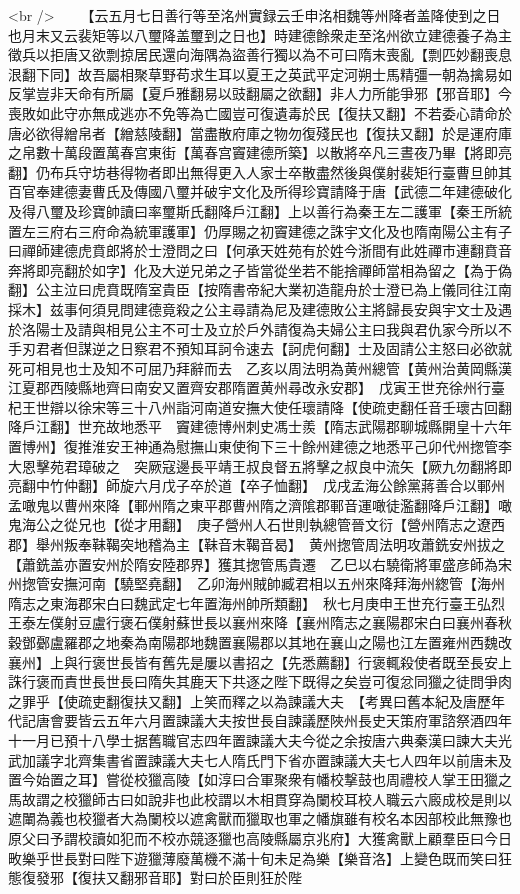 <br />
　　【云五月七日善行等至洺州實録云壬申洺相魏等州降者盖降使到之日也月末又云裴矩等以八璽降盖璽到之日也】時建德餘衆走至洺州欲立建德養子為主徵兵以拒唐又欲剽掠居民還向海隅為盜善行獨以為不可曰隋末喪亂【剽匹妙翻喪息泿翻下同】故吾屬相聚草野苟求生耳以夏王之英武平定河朔士馬精彊一朝為擒易如反掌豈非天命有所屬【夏戶雅翻易以豉翻屬之欲翻】非人力所能爭邪【邪音耶】今喪敗如此守亦無成逃亦不免等為亡國豈可復遺毒於民【復扶又翻】不若委心請命於唐必欲得繒帛者【繒慈陵翻】當盡散府庫之物勿復殘民也【復扶又翻】於是運府庫之帛數十萬段置萬春宫東街【萬春宫竇建德所築】以散將卒凡三晝夜乃畢【將即亮翻】仍布兵守坊巷得物者即出無得更入人家士卒散盡然後與僕射裴矩行臺曹旦帥其百官奉建德妻曹氏及傳國八璽并破宇文化及所得珍寶請降于唐【武德二年建德破化及得八璽及珍寶帥讀曰率璽斯氏翻降戶江翻】上以善行為秦王左二護軍【秦王所統置左三府右三府命為統軍護軍】仍厚賜之初竇建德之誅宇文化及也隋南陽公主有子曰禪師建德虎賁郎將於士澄問之曰【何承天姓苑有於姓今浙間有此姓禪市連翻賁音奔將即亮翻於如字】化及大逆兄弟之子皆當從坐若不能捨禪師當相為留之【為于偽翻】公主泣曰虎賁既隋室貴臣【按隋書帝紀大業初造龍舟於士澄已為上儀同往江南採木】兹事何須見問建德竟殺之公主尋請為尼及建德敗公主將歸長安與宇文士及遇於洛陽士及請與相見公主不可士及立於戶外請復為夫婦公主曰我與君仇家今所以不手刃君者但謀逆之日察君不預知耳訶令速去【訶虎何翻】士及固請公主怒曰必欲就死可相見也士及知不可屈乃拜辭而去　乙亥以周法明為黄州總管【黄州治黄岡縣漢江夏郡西陵縣地齊曰南安又置齊安郡隋置黄州尋改永安郡】　戊寅王世充徐州行臺杞王世辯以徐宋等三十八州詣河南道安撫大使任瓌請降【使疏吏翻任音壬瓌古回翻降戶江翻】世充故地悉平　竇建德博州刺史馮士羨【隋志武陽郡聊城縣開皇十六年置博州】復推淮安王神通為慰撫山東使徇下三十餘州建德之地悉平己卯代州揔管李大恩擊苑君璋破之　突厥寇邊長平靖王叔良督五將擊之叔良中流矢【厥九勿翻將即亮翻中竹仲翻】師旋六月戊子卒於道【卒子恤翻】　戊戌孟海公餘黨蔣善合以鄆州孟噉鬼以曹州來降【鄆州隋之東平郡曹州隋之濟隂郡鄆音運噉徒濫翻降戶江翻】噉鬼海公之從兄也【從才用翻】　庚子營州人石世則執總管晉文衍【營州隋志之遼西郡】舉州叛奉靺鞨突地稽為主【靺音末鞨音曷】　黄州揔管周法明攻蕭銑安州拔之【蕭銑盖亦置安州於隋安陸郡界】獲其揔管馬貴遷　乙巳以右驍衛將軍盛彦師為宋州揔管安撫河南【驍堅堯翻】　乙卯海州賊帥臧君相以五州來降拜海州緫管【海州隋志之東海郡宋白曰魏武定七年置海州帥所類翻】　秋七月庚申王世充行臺王弘烈王泰左僕射豆盧行褒石僕射蘇世長以襄州來降【襄州隋志之襄陽郡宋白曰襄州春秋穀鄧鄾盧羅郡之地秦為南陽郡地魏置襄陽郡以其地在襄山之陽也江左置雍州西魏改襄州】上與行褒世長皆有舊先是屢以書招之【先悉薦翻】行褒輒殺使者既至長安上誅行褒而責世長世長曰隋失其鹿天下共逐之陛下既得之矣豈可復忿同獵之徒問爭肉之罪乎【使疏吏翻復扶又翻】上笑而釋之以為諫議大夫　【考異曰舊本紀及唐歷年代記唐會要皆云五年六月置諫議大夫按世長自諫議歷陜州長史天策府軍諮祭酒四年十一月已預十八學士据舊職官志四年置諫議大夫今從之余按唐六典秦漢曰諫大夫光武加議字北齊集書省置諫議大夫七人隋氏門下省亦置諫議大夫七人四年以前唐未及置今始置之耳】嘗從校獵高陵【如淳曰合軍聚衆有幡校撃鼓也周禮校人掌王田獵之馬故謂之校獵師古曰如說非也此校謂以木相貫穿為闌校耳校人職云六廄成校是則以遮閳為義也校獵者大為闌校以遮禽獸而獵取也軍之幡旗雖有校名本因部校此無豫也原父曰予謂校讀如犯而不校亦競逐獵也高陵縣屬京兆府】大獲禽獸上顧羣臣曰今日畋樂乎世長對曰陛下遊獵薄廢萬機不滿十旬未足為樂【樂音洛】上變色既而笑曰狂態復發邪【復扶又翻邪音耶】對曰於臣則狂於陛